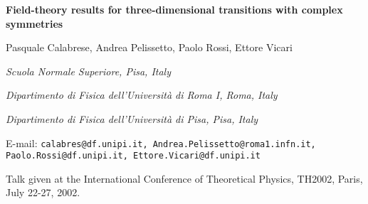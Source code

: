 \documentclass[a4paper,12pt]{article}
\begin{document}
\begin{titlepage}
\begin{center}
{\Large\bf Field-theory results for three-dimensional transitions with complex symmetries}
\end{center}
\vskip 1.3cm
\centerline{
Pasquale Calabrese,\coordHE{} 
Andrea Pelissetto,\coordHE{} 
Paolo Rossi,\coordHE{} 
Ettore Vicari\coordHE{}}

\vskip 0.4cm
\centerline{\sl  {}\coordHE{} Scuola Normale Superiore, Pisa, Italy} 
\centerline{\sl  {}\coordHE{} Dipartimento di Fisica dell'Universit\`a di Roma I,
                       Roma, Italy}
\centerline{\sl  {}\coordHE{} Dipartimento di Fisica dell'Universit\`a di Pisa,
                       Pisa, Italy}

\vskip 0.4cm
\begin{center}
E-mail: {\tt calabres@df.unipi.it, Andrea.Pelissetto@roma1.infn.it,} \\

{\tt Paolo.Rossi@df.unipi.it, Ettore.Vicari@df.unipi.it}
\end{center}


\begin{abstract}
We discuss several examples of three-dimensional critical phenomena
that can be described by Landau-Ginzburg-Wilson \coordHE{} theories.
We present an overview of field-theoretical results
obtained from the analysis of high-order perturbative
series in the frameworks of the \myHighlight{$\epsilon$}\coordHE{} and of the fixed-dimension \coordHE{}
expansions.  In particular, we discuss 
the stability of the O(\coordHE{})-symmetric fixed
point in a generic \coordHE{}-component theory,
the critical behaviors of randomly dilute Ising-like systems
and frustrated spin systems with noncollinear order,
the multicritical behavior arising from the competition
of two distinct types of ordering with symmetry O(\coordHE{}) and O(\coordHE{}) 
respectively. 

\end{abstract}


\noindent
\myHighlight{$*$}\coordHE{}
Talk given at the International Conference of Theoretical Physics, TH2002, 
Paris, July 22-27, 2002.

\end{titlepage}
\end{document}
